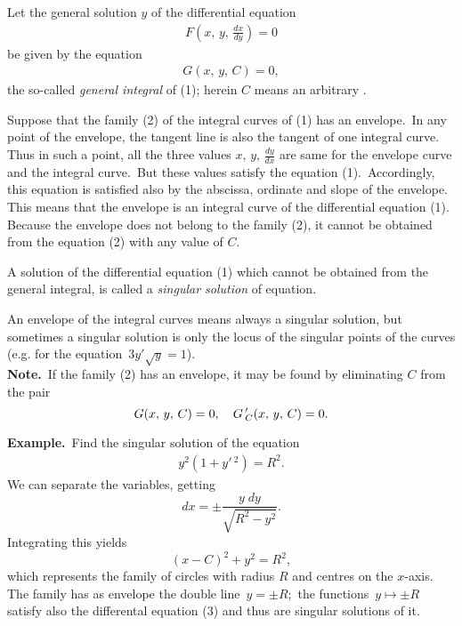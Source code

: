 \documentclass[12pt]{article}
\theoremstyle{definition}
\begin{document}
Let the general solution $y$ of the differential equation
\begin{align}
F(x,\,y,\,\frac{dx}{dy}) = 0
\end{align}
be given by the equation
\begin{align}
G(x,\,y,\,C) = 0,
\end{align}
the so-called {\em general integral} of (1); herein $C$ means an arbitrary .\, 

Suppose that the family (2) of the integral curves of (1) has an envelope.\, In any point of the envelope, the tangent line is also the tangent of one integral curve.\, Thus in such a point, all the three values $x,\, y,\,\frac{dy}{dx}$ are same for the envelope curve and the integral curve.\, But these values satisfy the equation (1).\, Accordingly, this equation is satisfied also by the abscissa, ordinate and slope of the envelope.\, This means that the envelope is an integral curve of the differential equation (1).\, Because the envelope does not belong to the family (2), it cannot be obtained from the equation (2) with any value of $C$.

A solution of the differential equation (1) which cannot be obtained from the general integral, is called a {\em singular solution} of equation.

An envelope of the integral curves means always a singular solution, but sometimes a singular solution is only the locus of the singular points of the curves (e.g. for the equation\, $3y'\sqrt{y} = 1$).\\

\textbf{Note.}\, If the family (2) has an envelope, it may be found by eliminating $C$ from the pair
\[
G(x,\,y,\,C) = 0, \quad G\,'_C(x,\,y,\,C) = 0.\\
\]

\textbf{Example.}\, Find the singular solution of the equation
\begin{align}
y^2(1+y'\,^2) = R^2.
\end{align}
We can separate the variables, getting
\[
dx = \pm\frac{y\;dy}{\sqrt{R^2-y^2}}.
\]
Integrating this yields 
\[
(x\!-\!C)^2+y^2 = R^2,
\]
which represents the family of circles with radius $R$ and centres on the $x$-axis.\, The family has as envelope the double line \,$y = \pm R$;\, the functions \,$y \mapsto \pm R$\, satisfy also the differental equation (3) and thus are singular solutions of it.



\end{document}
